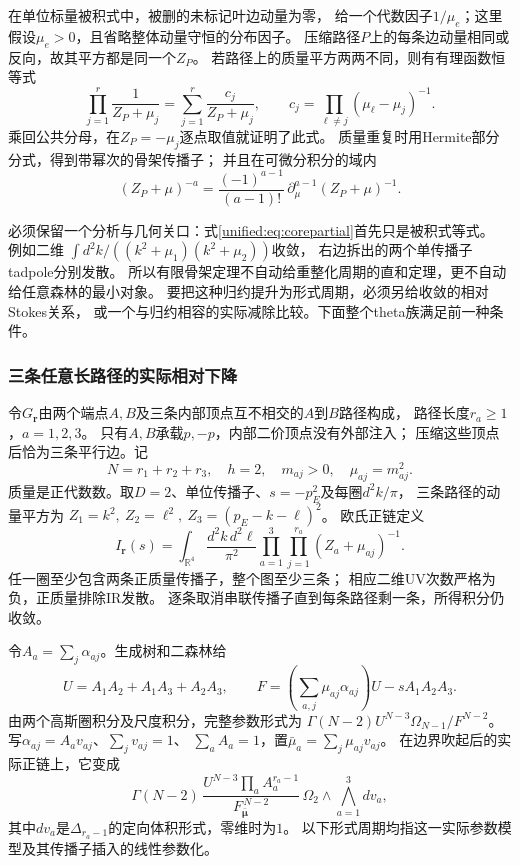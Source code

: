 \documentclass[11pt,a4paper,oneside]{ctexart}
\theoremstyle{cnplain}
\theoremstyle{definition}
\theoremstyle{remark}
\numberwithin{equation}{section}
\begin{document}
在单位标量被积式中，被删的未标记叶边动量为零，
给一个代数因子$1/\mu_e$；这里假设$\mu_e>0$，且省略整体动量守恒的分布因子。
压缩路径$P$上的每条边动量相同或反向，故其平方都是同一个$Z_P$。
若路径上的质量平方两两不同，则有有理函数恒等式
\begin{equation}\label{unified:eq:corepartial}
 \prod_{j=1}^{r}\frac1{Z_P+\mu_j}
 =\sum_{j=1}^{r}\frac{c_j}{Z_P+\mu_j},\qquad
 c_j=\prod_{\ell\ne j}(\mu_\ell-\mu_j)^{-1}.
\end{equation}
乘回公共分母，在$Z_P=-\mu_j$逐点取值就证明了此式。
质量重复时用Hermite部分分式，得到带幂次的骨架传播子；
并且在可微分积分的域内
\[
 (Z_P+\mu)^{-a}
 =\frac{(-1)^{a-1}}{(a-1)!}\,
       \partial_\mu^{a-1}(Z_P+\mu)^{-1}.
\]

必须保留一个分析与几何关口：式\eqref{unified:eq:corepartial}首先只是被积式等式。
例如二维
$\int d^2k/((k^2+\mu_1)(k^2+\mu_2))$收敛，
右边拆出的两个单传播子tadpole分别发散。
所以有限骨架定理不自动给重整化周期的直和定理，更不自动给任意森林的最小对象。
要把这种归约提升为形式周期，必须另给收敛的相对Stokes关系，
或一个与归约相容的实际减除比较。下面整个theta族满足前一种条件。

\subsubsection{三条任意长路径的实际相对下降}
令$G_{\mathbf r}$由两个端点$A,B$及三条内部顶点互不相交的$A$到$B$路径构成，
路径长度$r_a\ge1$，$a=1,2,3$。
只有$A,B$承载$p,-p$，内部二价顶点没有外部注入；
压缩这些顶点后恰为三条平行边。记
\[
 N=r_1+r_2+r_3,\quad h=2,\quad
 m_{aj}>0,\quad\mu_{aj}=m_{aj}^2 .
\]
质量是正代数数。取$D=2$、单位传播子、$s=-p_E^2$及每圈$d^2k/\pi$，
三条路径的动量平方为
$Z_1=k^2,\ Z_2=\ell^2,\ Z_3=(p_E-k-\ell)^2$。
欧氏正链定义
\[
 I_{\mathbf r}(s)=
 \int_{\mathbb R^4}\frac{d^2k\,d^2\ell}{\pi^2}
       \prod_{a=1}^3\prod_{j=1}^{r_a}(Z_a+\mu_{aj})^{-1}.
\]
任一圈至少包含两条正质量传播子，整个图至少三条；
相应二维UV次数严格为负，正质量排除IR发散。
逐条取消串联传播子直到每条路径剩一条，所得积分仍收敛。

令$A_a=\sum_j\alpha_{aj}$。生成树和二森林给
\begin{equation}\label{unified:eq:thetaUF}
 U=A_1A_2+A_1A_3+A_2A_3,\qquad
 F=\left(\sum_{a,j}\mu_{aj}\alpha_{aj}\right)U-sA_1A_2A_3 .
\end{equation}
由两个高斯圈积分及尺度积分，完整参数形式为
$\Gamma(N-2)U^{N-3}\Omega_{N-1}/F^{N-2}$。
写$\alpha_{aj}=A_av_{aj}$、$\sum_jv_{aj}=1$、
$\sum_a A_a=1$，置$\bar\mu_a=\sum_j\mu_{aj}v_{aj}$。
在边界吹起后的实际正链上，它变成
\begin{equation}\label{unified:eq:thetaproduct}
 \Gamma(N-2)\,
 \frac{U^{N-3}\prod_a A_a^{r_a-1}}
      {F_{\bar{\boldsymbol\mu}}^{\,N-2}}\,
 \Omega_2\wedge\bigwedge_{a=1}^3 dv_a ,
\end{equation}
其中$dv_a$是$\Delta_{r_a-1}$的定向体积形式，零维时为$1$。
以下形式周期均指这一实际参数模型及其传播子插入的线性参数化。
\end{document}
